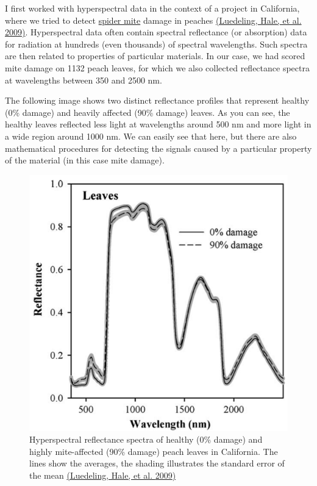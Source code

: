 \documentclass[
]{book}
\begin{document}
I first worked with hyperspectral data in the context of a project in California, where we tried to detect \href{https://en.wikipedia.org/wiki/Spider_mite}{spider mite} damage in peaches \href{https://www.sciencedirect.com/science/article/abs/pii/S0303243409000221}{(Luedeling, Hale, et al. \protect\hyperlink{ref-luedeling2009remote}{2009})}. Hyperspectral data often contain spectral reflectance (or absorption) data for radiation at hundreds (even thousands) of spectral wavelengths. Such spectra are then related to properties of particular materials. In our case, we had scored mite damage on 1132 peach leaves, for which we also collected reflectance spectra at wavelengths between 350 and 2500 nm.

The following image shows two distinct reflectance profiles that represent healthy (0\% damage) and heavily affected (90\% damage) leaves. As you can see, the healthy leaves reflected less light at wavelengths around 500 nm and more light in a wide region around 1000 nm. We can easily see that here, but there are also mathematical procedures for detecting the signals caused by a particular property of the material (in this case mite damage).

\begin{figure}
\centering
\includegraphics{pictures/Mites_spectra.png}
\caption{Hyperspectral reflectance spectra of healthy (0\% damage) and highly mite-affected (90\% damage) peach leaves in California. The lines show the averages, the shading illustrates the standard error of the mean \href{https://www.sciencedirect.com/science/article/abs/pii/S0303243409000221}{(Luedeling, Hale, et al. \protect\hyperlink{ref-luedeling2009remote}{2009})}}
\end{figure}
\end{document}

